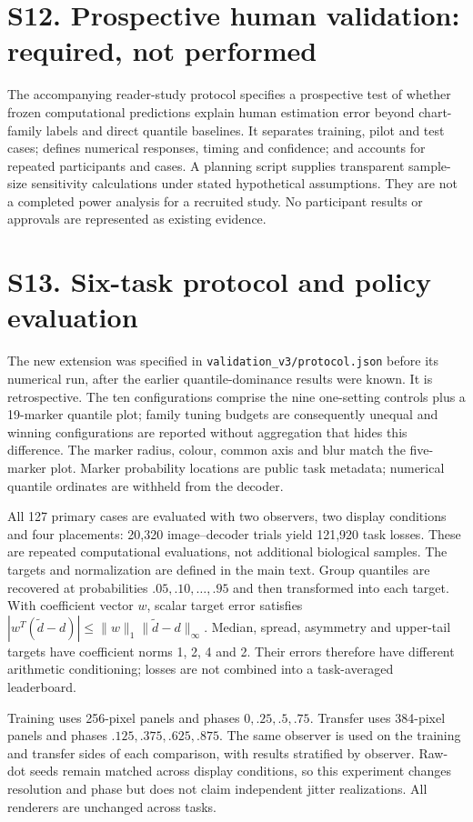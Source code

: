 \documentclass[10pt]{article}
\begin{document}
\section*{S12. Prospective human validation: required, not performed}
The accompanying reader-study protocol specifies a prospective test of whether frozen computational predictions explain human estimation error beyond chart-family labels and direct quantile baselines. It separates training, pilot and test cases; defines numerical responses, timing and confidence; and accounts for repeated participants and cases. A planning script supplies transparent sample-size sensitivity calculations under stated hypothetical assumptions. They are not a completed power analysis for a recruited study. No participant results or approvals are represented as existing evidence.
\section*{S13. Six-task protocol and policy evaluation}
The new extension was specified in \texttt{validation\_v3/protocol.json} before its numerical run, after the earlier quantile-dominance results were known. It is retrospective. The ten configurations comprise the nine one-setting controls plus a 19-marker quantile plot; family tuning budgets are consequently unequal and winning configurations are reported without aggregation that hides this difference. The marker radius, colour, common axis and blur match the five-marker plot. Marker probability locations are public task metadata; numerical quantile ordinates are withheld from the decoder.

All 127 primary cases are evaluated with two observers, two display conditions and four placements: 20,320 image--decoder trials yield 121,920 task losses. These are repeated computational evaluations, not additional biological samples. The targets and normalization are defined in the main text. Group quantiles are recovered at probabilities $.05,.10,\ldots,.95$ and then transformed into each target. With coefficient vector $w$, scalar target error satisfies $|w^T(\widetilde d-d)|\leq\|w\|_1\|\widetilde d-d\|_\infty$. Median, spread, asymmetry and upper-tail targets have coefficient norms 1, 2, 4 and 2. Their errors therefore have different arithmetic conditioning; losses are not combined into a task-averaged leaderboard.

Training uses 256-pixel panels and phases $0,.25,.5,.75$. Transfer uses 384-pixel panels and phases $.125,.375,.625,.875$. The same observer is used on the training and transfer sides of each comparison, with results stratified by observer. Raw-dot seeds remain matched across display conditions, so this experiment changes resolution and phase but does not claim independent jitter realizations. All renderers are unchanged across tasks.
\end{document}
